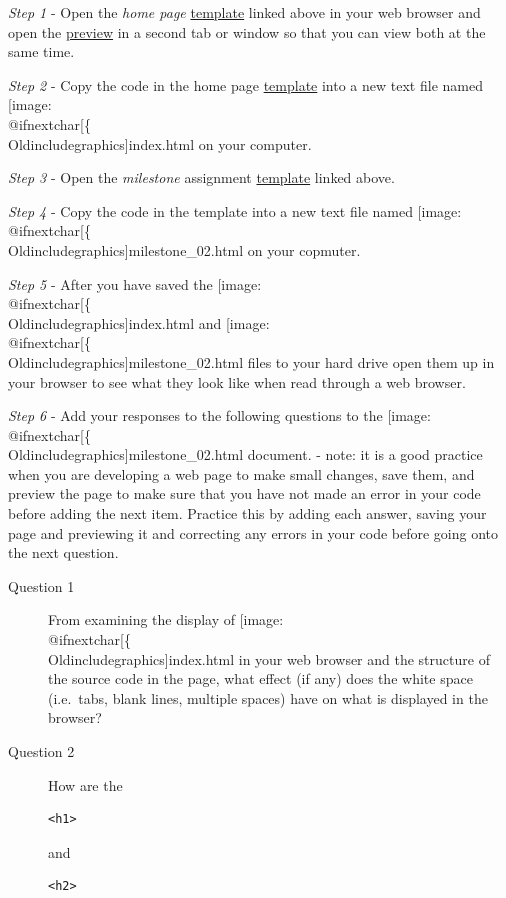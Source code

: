 \documentclass[]{book}
\makeatletter
\def\ScaleIfNeeded{%
  \ifdim\Gin@nat@width>.5\linewidth
    .5\linewidth
  \else
    \Gin@nat@width
  \fi
}
\let\Oldincludegraphics\texttt{[image: \%
 \\catcode`\\@=11\\relax\%
 \%\\gdef\\includegraphics\{\\@ifnextchar[\{\\Oldincludegraphics]}{\Oldincludegraphics[width=\ScaleIfNeeded]}}%
\gdef\texttt{[image: \\@ifnextchar[\{\\Oldincludegraphics]}{\Oldincludegraphics[max size={.75\textwidth}{.75\textheight}]}}%
\makeatother
\begin{document}
\emph{Step 1} - Open the \emph{home page}
\href{https://github.com/UNM-GEOG-485-585/class-materials/blob/master/sample-files/homePageTemplate.html}{template}
linked above in your web browser and open the
\href{http://htmlpreview.github.io/?https://github.com/UNM-GEOG-485-585/class-materials/blob/master/sample-files/homePageTemplate.html}{preview}
in a second tab or window so that you can view both at the same time.

\emph{Step 2} - Copy the code in the home page
\href{https://github.com/UNM-GEOG-485-585/class-materials/blob/master/sample-files/homePageTemplate.html}{template}
into a new text file named \texttt{index.html} on your computer.

\emph{Step 3} - Open the \emph{milestone} assignment
\href{https://github.com/UNM-GEOG-485-585/class-materials/blob/master/sample-files/assignmentTemplate.html}{template}
linked above.

\emph{Step 4} - Copy the code in the template into a new text file named
\texttt{milestone\_02.html} on your copmuter.

\emph{Step 5} - After you have saved the \texttt{index.html} and
\texttt{milestone\_02.html} files to your hard drive open them up in
your browser to see what they look like when read through a web browser.

\emph{Step 6} - Add your responses to the following questions to the
\texttt{milestone\_02.html} document. - note: it is a good practice when
you are developing a web page to make small changes, save them, and
preview the page to make sure that you have not made an error in your
code before adding the next item. Practice this by adding each answer,
saving your page and previewing it and correcting any errors in your
code before going onto the next question.

\begin{description}
\item[Question 1]
From examining the display of \texttt{index.html} in your web browser
and the structure of the source code in the page, what effect (if any)
does the white space (i.e.~tabs, blank lines, multiple spaces) have on
what is displayed in the browser?
\item[Question 2]
How are the

\begin{verbatim}
<h1>
\end{verbatim}

and

\begin{verbatim}
<h2>
\end{verbatim}
\end{description}
\end{document}

